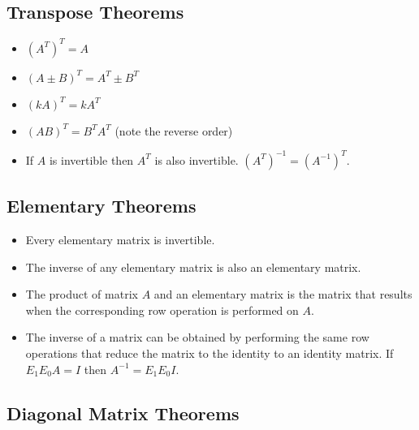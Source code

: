 \documentclass[12pt]{article}
\begin{document}
\subsection{Transpose Theorems}

\begin{itemize}
    \item $(A^T)^T = A$
    \item $(A \pm B)^T = A^T \pm B^T$
    \item $(kA)^T = kA^T$
    \item $(AB)^T = B^TA^T$ (note the reverse order)
    \item If $A$ is invertible then $A^T$ is also invertible. $(A^T)^{-1} = (A^{-1})^T$.
\end{itemize}


\subsection{Elementary Theorems}

\begin{itemize}
    \item Every elementary matrix is invertible.
    \item The inverse of any elementary matrix is also an elementary matrix.
    \item The product of matrix $A$ and an elementary matrix is the matrix that results when the corresponding row operation is performed on $A$.
    \item The inverse of a matrix can be obtained by performing the same row operations that reduce the matrix to the identity to an identity matrix. If $E_1E_0A = I$ then $A^{-1} = E_1E_0I$.
\end{itemize}


\subsection{Diagonal Matrix Theorems}
\end{document}
